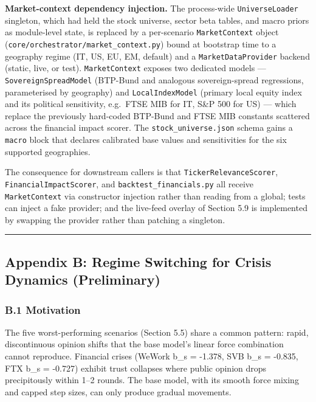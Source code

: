 \documentclass[
]{article}
\begin{document}
\textbf{Market-context dependency injection.} The process-wide
\texttt{UniverseLoader} singleton, which had held the stock universe,
sector beta tables, and macro priors as module-level state, is replaced
by a per-scenario \texttt{MarketContext} object
(\texttt{core/orchestrator/market\_context.py}) bound at bootstrap time
to a geography regime (IT, US, EU, EM, default) and a
\texttt{MarketDataProvider} backend (static, live, or test).
\texttt{MarketContext} exposes two dedicated models ---
\texttt{SovereignSpreadModel} (BTP-Bund and analogous sovereign-spread
regressions, parameterised by geography) and \texttt{LocalIndexModel}
(primary local equity index and its political sensitivity, e.g.~FTSE MIB
for IT, S\&P 500 for US) --- which replace the previously hard-coded
BTP-Bund and FTSE MIB constants scattered across the financial impact
scorer. The \texttt{stock\_universe.json} schema gains a \texttt{macro}
block that declares calibrated base values and sensitivities for the six
supported geographies.

The consequence for downstream callers is that
\texttt{TickerRelevanceScorer}, \texttt{FinancialImpactScorer}, and
\texttt{backtest\_financials.py} all receive \texttt{MarketContext} via
constructor injection rather than reading from a global; tests can
inject a fake provider; and the live-feed overlay of Section 5.9 is
implemented by swapping the provider rather than patching a singleton.

\begin{center}\rule{0.5\linewidth}{0.5pt}\end{center}

\subsection{Appendix B: Regime Switching for Crisis Dynamics
(Preliminary)}\label{appendix-b-regime-switching-for-crisis-dynamics-preliminary}

\subsubsection{B.1 Motivation}\label{b.1-motivation}

The five worst-performing scenarios (Section 5.5) share a common
pattern: rapid, discontinuous opinion shifts that the base model's
linear force combination cannot reproduce. Financial crises (WeWork b\_s
= -1.378, SVB b\_s = -0.835, FTX b\_s = -0.727) exhibit trust collapses
where public opinion drops precipitously within 1--2 rounds. The base
model, with its smooth force mixing and capped step sizes, can only
produce gradual movements.
\end{document}
